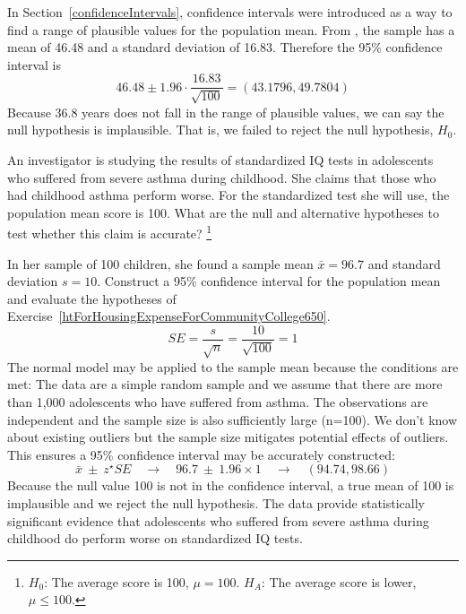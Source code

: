 In Section~\ref{confidenceIntervals}, confidence intervals were introduced as a way to find a range of plausible values for the population mean. From , the sample has a mean of 46.48 and a standard deviation of 16.83. Therefore the 95\% confidence interval is \[46.48 \pm 1.96 \cdot \frac{16.83}{\sqrt{100}} = (43.1796, 49.7804)\] Because 36.8 years does not fall in the range of plausible values, we can say the null hypothesis is implausible. That is, we failed to reject the null hypothesis, $H_0$. 

\begin{exercise} \label{htForHousingExpenseForCommunityCollege650}
An investigator is studying the results of standardized IQ tests in adolescents who suffered from severe asthma during childhood. She claims that those who had childhood asthma perform worse. For the standardized test she will use, the population mean score is 100. What are the null and alternative hypotheses to test whether this claim is accurate? \footnote{$H_0$: The average score is 100, $\mu = 100$. \hspace{3.4mm} $H_A$: The average score is lower, $\mu \leq 100$.}
\end{exercise}

\begin{example}{In her sample of 100 children, she found a sample mean $\bar{x} = 96.7$ and standard deviation $s = 10$. Construct a 95\% confidence interval for the population mean and evaluate the hypotheses of Exercise~\ref{htForHousingExpenseForCommunityCollege650}.}
$$ SE = \frac{s}{\sqrt{n}} = \frac{10}{\sqrt{100}} = 1 $$
The normal model may be applied to the sample mean because the conditions are met: The data are a simple random sample and we assume that there are more than 1,000 adolescents who have suffered from asthma. The observations are independent and the sample size is also sufficiently large (n=100). We don't know about existing outliers but the sample size mitigates potential effects of outliers. This ensures a 95\% confidence interval may be accurately constructed:
$$\bar{x}\ \pm\ z^{\star} SE \quad\to\quad 96.7\ \pm\ 1.96 \times  1 \quad \to \quad (94.74, 98.66) $$
Because the null value 100 is not in the confidence interval, a true mean of 100 is implausible and we reject the null hypothesis. The data provide statistically significant evidence that adolescents who suffered from severe asthma during childhood do perform worse on standardized IQ tests. 
\end{example}


